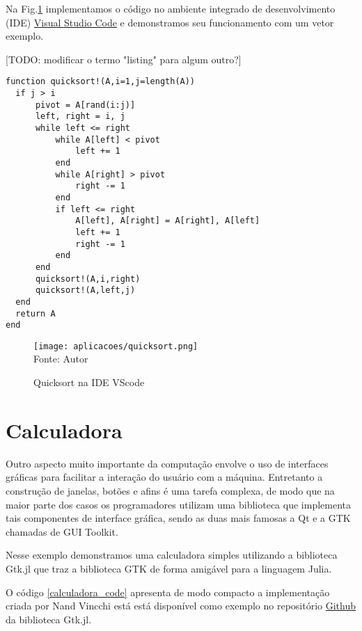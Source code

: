 Na Fig.\ref{quicksort} implementamos o código no ambiente integrado de desenvolvimento (IDE) \href{https://code.visualstudio.com/docs}{Visual Studio Code} e demonstramos seu funcionamento com um vetor exemplo. 

[TODO: modificar o termo "listing" para algum outro?] 
\begin{lstlisting}[label={quicksort_code},caption={Implementação do algoritmo quicksort em Julia}]
  function quicksort!(A,i=1,j=length(A))
  if j > i
      pivot = A[rand(i:j)] 
      left, right = i, j
      while left <= right
          while A[left] < pivot
              left += 1
          end
          while A[right] > pivot
              right -= 1
          end
          if left <= right
              A[left], A[right] = A[right], A[left]
              left += 1
              right -= 1
          end
      end
      quicksort!(A,i,right)
      quicksort!(A,left,j)
  end
  return A
end
\end{lstlisting}

\begin{figure}[H]
   \begin{center}
       \caption{Quicksort na IDE VScode} \label{quicksort}
       \texttt{[image: aplicacoes/quicksort.png]} \\
       {\tiny \sf Fonte: Autor}
   \end{center}
\end{figure}

\section{Calculadora}
Outro aspecto muito importante da computação envolve o uso de interfaces gráficas para facilitar a interação do usuário com a máquina.
Entretanto a construção de janelas, botões e afins é uma tarefa complexa, de modo que na maior parte dos casos os programadores utilizam uma biblioteca que implementa tais componentes de interface gráfica, sendo as duas mais famosas a Qt e a GTK chamadas de GUI Toolkit. %

Nesse exemplo demonstramos uma calculadora simples utilizando a biblioteca Gtk.jl que traz a biblioteca GTK de forma amigável para a linguagem Julia. 

O código \ref{calculadora_code} apresenta de modo compacto a implementação criada por Nand Vincchi está está disponível como exemplo no repositório \href{https://github.com/JuliaGraphics/Gtk.jl/blob/master/example/calculator.jl}{Github} da biblioteca Gtk.jl. 

